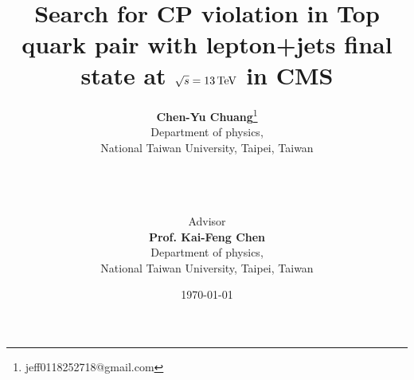 \linespread{0.8}
 


\title{\aline{}\\~\\Search for CP violation in Top quark pair with lepton+jets final state at $\sqrt{s} = 13\,\text{Te\hspace{-.08em}V}$ in CMS \\\aline{}}

\author{
\textbf{Chen-Yu Chuang}\thanks{jeff0118252718@gmail.com}\\
Department of physics,\\
National Taiwan University, Taipei, Taiwan\\
~\\
~\\
~\\
\and
Advisor\\
\textbf{Prof. Kai-Feng Chen}\\
Department of physics,\\
National Taiwan University, Taipei, Taiwan
}
\date{\today}
\maketitle
\thispagestyle{empty} %

\newpage
\thispagestyle{empty} %